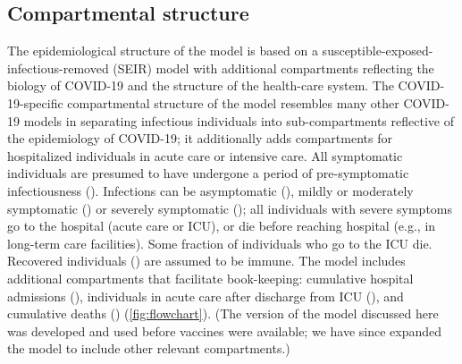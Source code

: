 \documentclass[12pt]{article}\usepackage[]{graphicx}\usepackage[]{color}
\begin{document}
\subsection*{Compartmental structure}

The epidemiological structure of the model is based on a susceptible-exposed-infectious-removed (SEIR) model with additional compartments reflecting the biology of COVID-19 and the structure of the health-care system. 
The COVID-19-specific compartmental structure of the model resembles many other COVID-19 models \cite{childs2021impact, tuite2020mathematical, kainChopping2021} in separating infectious individuals into sub-compartments reflective of the epidemiology of COVID-19; it additionally adds compartments for hospitalized individuals in acute care or intensive care. 
All symptomatic individuals are presumed to have undergone a period of pre-symptomatic infectiousness (). 
Infections can be asymptomatic (), mildly or moderately symptomatic () or severely symptomatic (); all individuals with severe symptoms go to the hospital (acute care or ICU), or die before reaching hospital (e.g., in long-term care facilities).
Some fraction  of individuals who go to the ICU die. Recovered individuals () are assumed to be immune.  
The model includes additional compartments that facilitate book-keeping: cumulative hospital admissions (), individuals in acute care after discharge from ICU (), and cumulative deaths () (\cref{fig:flowchart}).
(The version of the model discussed here was developed and used before vaccines were available; we have since expanded the model to include other relevant compartments.)

\end{document}

